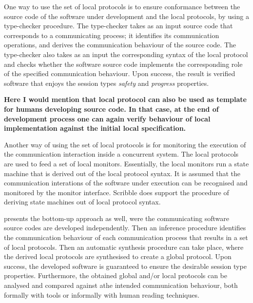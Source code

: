 One way to use the set of local protocols is to ensure
conformance between the source code of the
software under development and the local protocols,
by using a type-checker procedure.
The type-checker takes as an input
source code that corresponds to a communicating process;
it identifies its communication operations,
and derives the communication behaviour of
the
source code.
The type-checker also takes as an input the
corresponding syntax of the local protocol 
and checks whether the 
software source code
implements the corresponding role of the specified communication behaviour.
Upon success, the result is verified software that
enjoys the session types {\em safety} and {\em progress}
properties.

\textbf{Here I would mention that local protocol can also be used as template for humans 
developing source code. In that case, at the end of development process one can again verify behaviour 
of local implementation against the initial local specification.}

Another way of using the set of local protocols is
for monitoring the execution of the communication
interaction inside a concurrent system.
The local protocols are used to feed a set of local monitors.
Essentially, the local monitors run a state machine that is derived
out of the local protocol syntax.
It is assumed that the communication interations
of the software under execution can be recognised
and monitored by the monitor interface.
Scribble does support the procedure of deriving
state machines out of local protocol syntax.

presents the bottom-up approach as well,
were the communicating 
software source codes
are developed independently.
Then an inference  procedure identifies the communication behaviour
of each
communication process that results in a set of local protocols.
Then an automatic synthesis procedure can take place,
where the derived local protocols are synthesised
to create a global protocol. Upon success, the
developed software is guaranteed to ensure
the desirable session type properties.
Furthermore, the obtained global and/or local protocols can be
analysed and compared against athe intended communication
behaviour, both formally with tools or informally with
human reading techniques.

